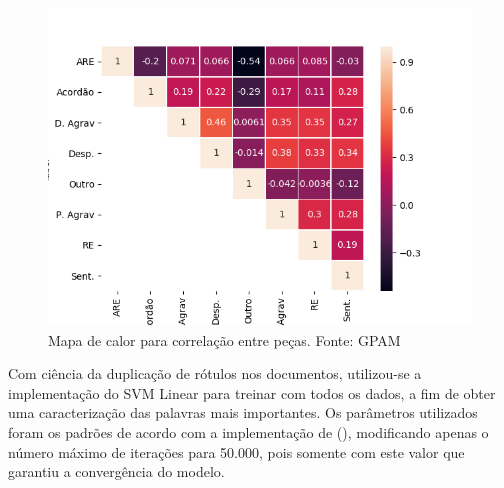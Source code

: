 \begin{figure}
  \includegraphics[keepaspectratio=true,scale=0.5]{figuras/correlacaoPecas}
  \centering
  \caption[Mapa de calor para correlação entre peças]{Mapa de calor para correlação entre peças. Fonte: GPAM \protect\footnotemark}
  \label{fig:correlacaoPecas}
\end{figure}

Com ciência da duplicação de rótulos nos documentos, utilizou-se a implementação do SVM Linear \cite{HEARST1995} para treinar com todos os dados, a fim de obter uma caracterização das palavras mais importantes. Os parâmetros utilizados foram os padrões de acordo com a implementação de \citeauthor{PEDREGOSA2011} (\citeyear{PEDREGOSA2011}), modificando apenas o número máximo de iterações para 50.000, pois somente com este valor que garantiu a convergência do modelo.

